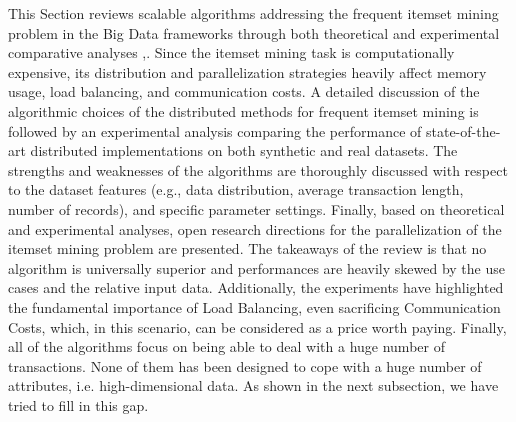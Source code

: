 This Section reviews scalable algorithms addressing the frequent itemset mining 
problem in the Big Data frameworks through both theoretical and experimental 
comparative analyses \cite{apiletti2015review},\cite{survey_pulvi}. 
Since the itemset mining task is computationally expensive, its distribution and 
parallelization strategies heavily affect memory usage, load balancing, 
and communication costs.  
A detailed discussion of the algorithmic choices of the  
distributed methods for frequent itemset mining is followed by an experimental 
analysis comparing the performance of state-of-the-art distributed implementations on both 
synthetic and real datasets. 
The strengths and weaknesses of the algorithms are
thoroughly discussed with respect 
to the dataset features (e.g., data distribution, average 
transaction length, number of records), 
and specific parameter settings. 
Finally, based on theoretical and experimental analyses, open 
research directions for the parallelization of the itemset mining problem 
are presented.
The takeaways of the review is that no algorithm is universally superior and performances are heavily skewed by the use cases and the relative input data. Additionally, the experiments have highlighted the fundamental importance of Load Balancing, even sacrificing Communication Costs, which, in this scenario, can be considered as a price worth paying.
Finally, all of the algorithms focus on being able to deal with a huge number of transactions. None of them has been designed to cope with a huge number of attributes, i.e. high-dimensional data. As shown in the next subsection, we have tried to fill in this gap.
%
%
%

